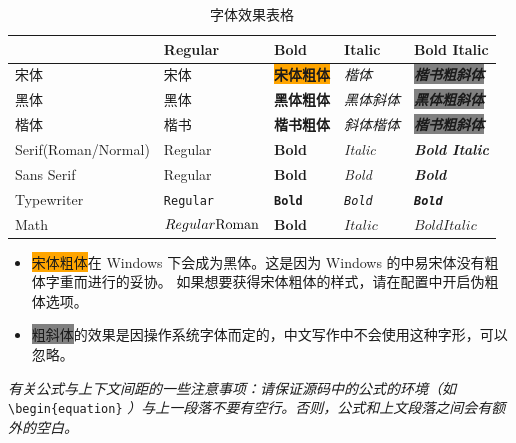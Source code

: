 \begin{table}[htb]
    \linespread{1.5}
    \centering
    \caption{字体效果表格}
    \begin{tabular}{@{}lllll@{}}
    \toprule
               & Regular & Bold & Italic & Bold Italic \\ \midrule
      宋体       & 宋体      & \colorbox{orange}{\textbf{宋体粗体}} & \textit{楷体}     &   \colorbox{gray}{\textbf{\textit{楷书粗斜体}}}  \\
      黑体         & {\heiti{}黑体}      & \textbf{\heiti{}黑体粗体} &   \textit{\heiti{}黑体斜体}     & \colorbox{gray}{\textit{\textbf{\heiti{}黑体粗斜体}}}   \\
      楷体         & {\kaishu{}楷书}      & \textbf{\kaishu{}楷书粗体} & \textit{\kaishu{}斜体楷体} &  \colorbox{gray}{\textbf{\textit{\kaishu{}楷书粗斜体}}}    \\
    Serif(Roman/Normal)      &    Regular    &  \textbf{Bold}  &    \textit{Italic}    &     \textbf{\textit{Bold Italic}}    \\
    Sans Serif &  \textsf{Regular}       &  \textbf{\textsf{Bold}}    &  \textit{\textsf{Bold}}   &    \textbf{\textit{\textsf{Bold}}}   \\
    Typewriter &  \texttt{Regular}       &  \textbf{\texttt{Bold}}    &  \textit{\texttt{Bold}}   &    \textbf{\textit{\texttt{Bold}}}   \\
    Math       &   $\mathnormal{Regular} \mathrm{Roman}$  & $\mathbf{Bold}$   &    $\mathit{Italic}$    &  $\mathbf{\mathit{Bold Italic}}$    \\ \bottomrule
    \end{tabular}
\end{table}

\begin{itemize}[nosep]
  \item \colorbox{orange}{宋体粗体}在 Windows 下会成为黑体。这是因为 Windows 的中易宋体没有粗体字重而进行的妥协。
    如果想要获得宋体粗体的样式，请在配置中开启伪粗体选项。
  \item \colorbox{gray}{粗斜体}的效果是因操作系统字体而定的，中文写作中不会使用这种字形，可以忽略。
\end{itemize}

\textit{有关公式与上下文间距的一些注意事项：请保证源码中的公式的环境（如}
\\ \verb|\begin{equation}|
  \textit{）与上一段落不要有空行。否则，公式和上文段落之间会有额外的空白。}

